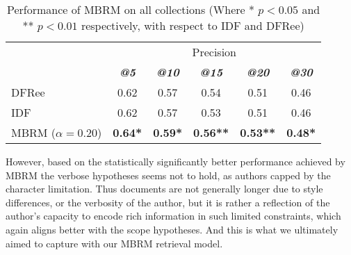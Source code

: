 \begin{table}[] 	
	  	  	\centering
	  	  	\caption{Performance of MBRM on all collections (Where * $p<0.05$ and ** $p<0.01$ respectively, with respect to IDF and DFRee)} 
	  	 	\begin{tabular}{l|c|c|c|c|c} 	  	 	
	  	 	\cline{2- 6}
	  	 	\multicolumn{1}{c}{}&\multicolumn{5}{c}{Precision} \\ 
	  	 	\cline{2- 6} &
	  	 	\textit{\textbf{@5}} & 
	  	 	\textit{\textbf{@10}} & 
	  	 	\textit{\textbf{@15}} & 
	  	 	\textit{\textbf{@20}} & 
	  	 	\textit{\textbf{@30}} 
	  	 	\tabularnewline
	  	 	\hline
	 	 	 DFRee  & 0.62 & 0.57 & 0.54 & 0.51 & 0.46 \\
	 	 	 IDF  & 0.62 & 0.57 & 0.53 & 0.51 & 0.46 \\
	 	 	 \hline
 	 	 	 \hline
  	  	 	 MBRM ($\alpha=0.20$)  & \textbf{0.64*} & \textbf{0.59*} & \textbf{0.56**} & \textbf{0.53**} & \textbf{0.48*} \\
	  	  	\hline
	  	  	\end{tabular}
	  	  	\label{MBRMPerformance}	
\end{table}


However, based on the statistically significantly better performance achieved by MBRM the verbose hypotheses seems not to hold, as authors capped by the character limitation. Thus documents are not generally longer due to style differences, or the verbosity of the author, but it is rather a reflection of the author's capacity to encode rich information in such limited constraints, which again aligns better with the scope hypotheses. And this is what we ultimately aimed to capture with our MBRM retrieval model.
